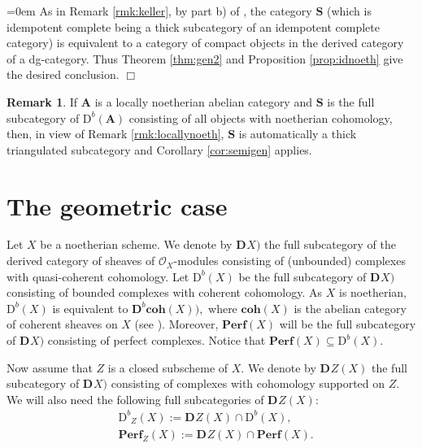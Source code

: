 \documentclass[a4paper,11pt,twoside]{amsart}
\numberwithin{equation}{section}
\theoremstyle{definition}
\newtheorem{remark}[thm]{Remark}
\renewenvironment{proof}{\par\vspace{-5pt}\par\noindent\begingroup\leftskip=0em\hspace{0em}{\bf Proof.}}{\endgroup\hfill$\Box$}
\begin{document}
\begin{proof}
As in Remark \ref{rmk:keller}, by part b) of \cite[Thm.\ 3.8]{K}, the category ${{\mathbf{{S}}}}$ (which is idempotent complete being a thick subcategory of an idempotent complete category) is equivalent to a category of compact objects in the derived category of a dg-category.
Thus Theorem \ref{thm:gen2} and Proposition \ref{prop:idnoeth} give the desired conclusion.
\end{proof}

\begin{remark}\label{rmk:locallynoeth2}
If ${{\mathbf{{A}}}}$ is a locally noetherian abelian category and ${{\mathbf{{S}}}}$ is the full subcategory of ${\mathrm{D}^b}({{\mathbf{{A}}}})$ consisting of all objects with noetherian cohomology, then, in view of Remark \ref{rmk:locallynoeth}, ${{\mathbf{{S}}}}$ is automatically a thick triangulated subcategory and Corollary \ref{cor:semigen} applies.
\end{remark}

\section{The geometric case}\label{subsec:geometry}

Let $X$ be a noetherian scheme. We denote by ${\mathbf{D}^{}}X)$ the full
subcategory of the derived category of sheaves of ${{\mathcal{{O}}}}_X$-modules
consisting of (unbounded) complexes with quasi-coherent
cohomology. Let ${\mathrm{D}^b}(X)$ be the full subcategory of ${\mathbf{D}^{}}X)$
consisting of bounded complexes with coherent cohomology. As $X$ is noetherian, ${\mathrm{D}^b}(X)$ is equivalent to ${\mathbf{D}^{b}}{{{\mathbf{{coh}}}}}(X)),$ where ${{{\mathbf{{coh}}}}}(X)$ is the abelian category of coherent sheaves on $X$ (see \cite[Cor.\ 2.2.2.2]{Il}). Moreover,
${{{\mathbf{{Perf}}}}}(X)$ will be the full subcategory of ${\mathbf{D}^{}}X)$ consisting of perfect
complexes. Notice that ${{{\mathbf{{Perf}}}}}(X)\subseteq{\mathrm{D}^b}(X).$

Now assume that $Z$ is a closed subscheme of $X.$ We denote by
${\mathbf{D}^{}}Z(X)$ the full subcategory of ${\mathbf{D}^{}}X)$ consisting of complexes with
cohomology supported on $Z.$ We will also need the following full
subcategories of ${\mathbf{D}^{}}Z(X)$:
\[
\begin{split}
&{\mathrm{D}^b}_Z(X):={\mathbf{D}^{}}Z(X)\cap{\mathrm{D}^b}(X),\\
&{{{\mathbf{{Perf}}}}}_Z(X):={\mathbf{D}^{}}Z(X)\cap{{{\mathbf{{Perf}}}}}(X).
\end{split}
\]
\end{document}
